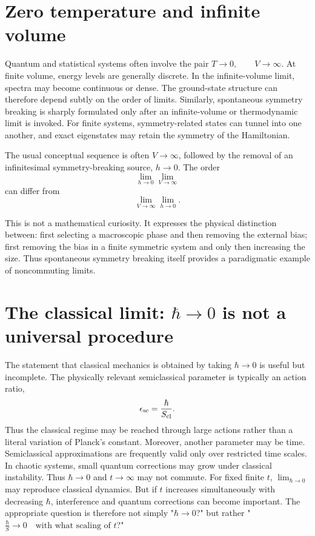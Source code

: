 \section{Zero temperature and infinite volume}
Quantum and statistical systems often involve the pair
$T\rightarrow 0,\qquad V\rightarrow\infty$.
At finite volume, energy levels are generally discrete. In the infinite-volume limit, 
spectra may become continuous or dense.
The ground-state structure can therefore depend subtly on the order of limits.
Similarly, spontaneous symmetry breaking is sharply formulated only after an
infinite-volume or thermodynamic limit is invoked. For finite systems,
symmetry-related states can tunnel into one another, and exact eigenstates may
retain the symmetry of the Hamiltonian.

The usual conceptual sequence is often
$V\rightarrow\infty$,
followed by the removal of an infinitesimal symmetry-breaking source,
$h\rightarrow 0$.
The order
\[\lim_{h\to0}\lim_{V\to\infty}\]
can differ from
\[\lim_{V\to\infty}\lim_{h\to0}.\]

This is not a mathematical curiosity. It expresses the physical distinction between:
 first selecting a macroscopic phase and then removing the external bias;
 first removing the bias in a finite symmetric system and only then increasing the size.
Thus spontaneous symmetry breaking itself provides a paradigmatic example of noncommuting limits.

\section{The classical limit: $\hbar\to 0$ is not a universal procedure}
The statement that classical mechanics is obtained by taking
$\hbar\rightarrow 0$ is useful but incomplete.
The physically relevant semiclassical parameter is typically an action ratio,
\[\epsilon_{\rm sc}=\frac{\hbar}{S_{\rm cl}}.\]
Thus the classical regime may be reached through large actions rather than a literal variation of Planck's constant.
Moreover, another parameter may be time.
Semiclassical approximations are frequently valid only over restricted time scales. In chaotic systems, small quantum corrections may grow under classical instability.
Thus $\hbar\rightarrow 0$ and $t\rightarrow\infty$ may not commute.
For fixed finite $t$, $\lim_{\hbar\to0}$ 
may reproduce classical dynamics.
But if $t$ increases simultaneously with decreasing $\hbar$, 
interference and quantum corrections can become important.
The appropriate question is therefore not simply
"$\hbar\rightarrow 0$?" but rather "$\frac{\hbar}{S}\rightarrow 0 \quad\text{with what scaling of }t$?"


